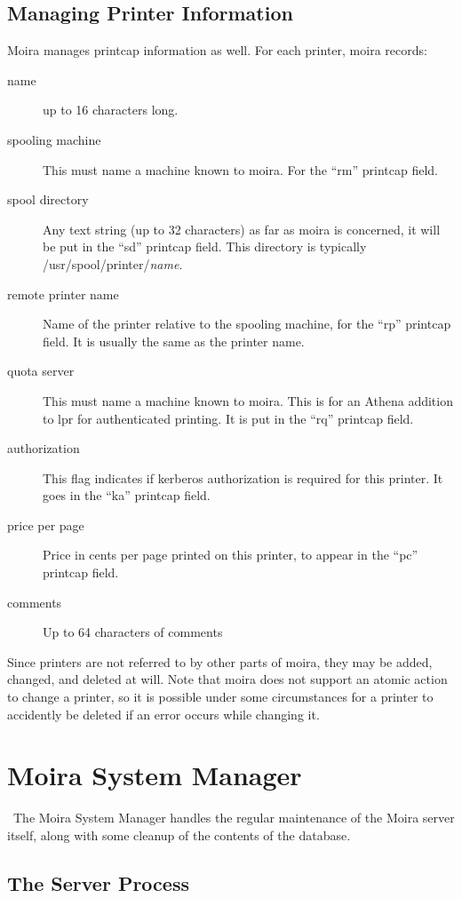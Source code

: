 \documentclass{book}
\begin{document}
\section{Managing Printer Information}

Moira manages printcap information as well.  For each printer, moira
records:
\begin{description}
\item[name] up to 16 characters long.
\item[spooling machine] This must name a machine known to moira.  For the
``rm'' printcap field.
\item[spool directory] Any text string (up to 32 characters) as far as moira
is concerned, it will be put in the ``sd'' printcap field.  This
directory is typically /usr/spool/printer/{\em name}.
\item[remote printer name] Name of the printer relative to the spooling
machine, for the ``rp'' printcap field.  It is usually the same as the
printer name. 
\item[quota server] This must name a machine known to moira.  This is for an
Athena addition to lpr for authenticated printing.  It is put in the
``rq'' printcap field.
\item[authorization] This flag indicates if kerberos authorization is
required for this printer.  It goes in the ``ka'' printcap field.
\item[price per page] Price in cents per page printed on this printer, to
appear in the ``pc'' printcap field.
\item[comments] Up to 64 characters of comments
\end{description}

Since printers are not referred to by other parts of moira, they may
be added, changed, and deleted at will.  Note that moira does not
support an atomic action to change a printer, so it is possible under
some circumstances for a printer to accidently be deleted if an error
occurs while changing it.


\chapter{Moira System Manager}

\athena\ The Moira System Manager handles the regular maintenance of
the Moira server itself, along with some cleanup of the contents of
the database.

\section{The Server Process}
\end{document}

